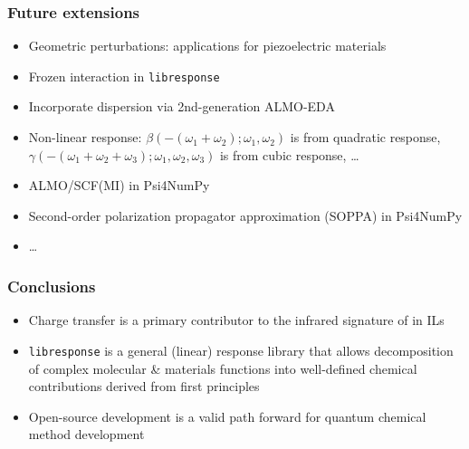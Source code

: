 \documentclass[%
    xcolor=usenames,dvipsnames,svgnames%
]{beamer}
\newcommand\pfn{Psi4NumPy}
\newcommand\libresponse{\texttt{libresponse}}
\begin{document}
\begin{frame}
  \frametitle{Future extensions}
  \begin{itemize}
  \item Geometric perturbations: applications for piezoelectric materials
  \item Frozen interaction in \libresponse{}
  \item Incorporate dispersion via 2nd-generation ALMO-EDA
  \item Non-linear response: \(\beta(-(\omega_{1}+\omega_{2});\omega_{1},\omega_{2})\) is from quadratic response, \(\gamma(-(\omega_{1}+\omega_{2}+\omega_{3});\omega_{1},\omega_{2},\omega_{3})\) is from cubic response, \dots
  \item ALMO/SCF(MI) in \pfn{}
  \item Second-order polarization propagator approximation (SOPPA) in \pfn{}
  \item \dots
  \end{itemize}
\end{frame}

\begin{frame}
  \frametitle{Conclusions}
  \begin{itemize}
  \item Charge transfer is a primary contributor to the infrared signature of  in ILs
  \item \libresponse{} is a general (linear) response library that allows decomposition of complex molecular \& materials functions into well-defined chemical contributions derived from first principles
  \item Open-source development is a valid path forward for quantum chemical method development
  \end{itemize}
\end{frame}
\end{document}
